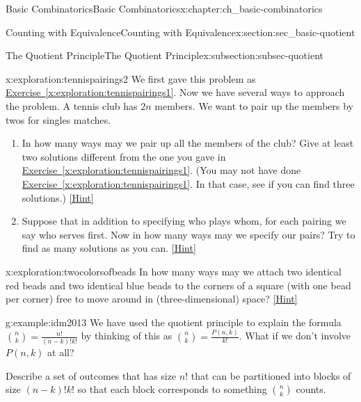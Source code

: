 \documentclass[oneside,10pt,]{book}
\numberwithin{equation}{chapter}
\begin{document}
\begin{chapterptx}{Basic Combinatorics}{}{Basic Combinatorics}{}{}{x:chapter:ch_basic-combinatorics}
\begin{sectionptx}{Counting with Equivalence}{}{Counting with Equivalence}{}{}{x:section:sec_basic-quotient}
\begin{subsectionptx}{The Quotient Principle}{}{The Quotient Principle}{}{}{x:subsection:subsec-quotient}
\begin{exploration}{}{x:exploration:tennispairings2}%
We first gave this problem as \hyperref[x:exploration:tennispairings1]{Exercise~\ref{x:exploration:tennispairings1}}. Now we have several ways to approach the problem. A tennis club has \(2n\) members. We want to pair up the members by twos for singles matches.%
\begin{enumerate}[font=\bfseries,label=(\alph*),ref=\alph*]
\item{}In how many ways may we pair up all the members of the club? Give at least two solutions different from the one you gave in   \hyperref[x:exploration:tennispairings1]{Exercise~\ref{x:exploration:tennispairings1}}. (You may not have done \hyperref[x:exploration:tennispairings1]{Exercise~\ref{x:exploration:tennispairings1}}. In that case, see if you can find three solutions.)%
\space\hspace*{0pt}\hfill{\tiny\hyperlink{g:hint:idm1956-back}{[Hint]}}\item{}Suppose that in addition to specifying who plays whom, for each pairing we say who serves first.  Now in how many ways may we specify our pairs? Try to find as many solutions as you can.%
\space\hspace*{0pt}\hfill{\tiny\hyperlink{g:hint:idm1982-back}{[Hint]}}\end{enumerate}
\end{exploration}
\begin{exploration}{}{x:exploration:twocolorsofbeads}%
In how many ways may we attach two identical red beads and two identical blue beads to the corners of a square (with one bead per corner) free to move around in (three-dimensional) space?%
\space\hspace*{0pt}\hfill{\tiny\hyperlink{g:hint:idm2005-back}{[Hint]}}\end{exploration}
\begin{example}{}{g:example:idm2013}%
We have used the quotient principle to explain the formula \(\binom{n}{k} = \frac{n!}{(n-k)!k!}\) by thinking of this as \(\binom{n}{k} = \frac{P(n,k)}{k!}\).  What if we don't involve \(P(n,k)\) at all?%
\par
Describe a set of outcomes that has size \(n!\) that can be partitioned into blocks of size \((n-k)!k!\) so that each block corresponds to something \(\binom{n}{k}\) counts.%
\par\smallskip%

\end{example}
\end{subsectionptx}
\end{sectionptx}
\end{chapterptx}
\end{document}
